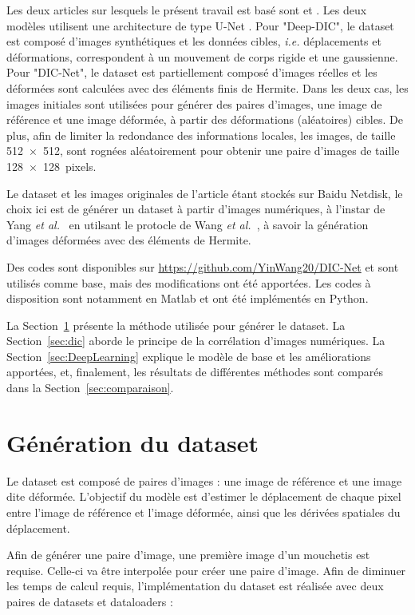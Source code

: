 \documentclass[
	a4paper, %
	10pt, %
	twoside, %
	french
]{LTJournalArticle}
\begin{document}
Les deux articles sur lesquels le présent travail est basé sont \cite{Yang:DeepDic2022} et \cite{WANG:2023107278}.
Les deux modèles utilisent une architecture de type U-Net \cite{ronneberger:2015}.
Pour "Deep-DIC", le dataset est composé d'images synthétiques et les données cibles, \textit{i.e.} déplacements et déformations, correspondent à un mouvement de corps rigide et une gaussienne.
Pour "DIC-Net", le dataset est partiellement composé d'images réelles et les déformées sont calculées avec des éléments finis de Hermite.
Dans les deux cas, les images initiales sont utilisées pour générer des paires d'images, une image de référence et une image déformée, à partir des déformations (aléatoires) cibles.
De plus, afin de limiter la redondance des informations locales, les images, de taille 512~$\times$~512, sont rognées aléatoirement pour obtenir une paire d'images de taille 128~$\times$~128~pixels.


Le dataset et les images originales de l'article \cite{WANG:2023107278} étant stockés sur Baidu Netdisk, le choix ici est de générer un dataset à partir d'images numériques, à l'instar de Yang \textit{et al.}~\cite{Yang:DeepDic2022} en utilsant le protocle de Wang \textit{et al.}~\cite{WANG:2023107278}, à savoir la génération d'images déformées avec des éléments de Hermite.

Des codes sont disponibles sur \url{https://github.com/YinWang20/DIC-Net} et sont utilisés comme base, mais des modifications ont été apportées.
Les codes à disposition sont notamment en Matlab\textregistered{} et ont été implémentés en Python.

La Section~\ref{sec:dataset} présente la méthode utilisée pour générer le dataset.
La Section~\ref{sec:dic} aborde le principe de la corrélation d'images numériques.
La Section~\ref{sec:DeepLearning} explique le modèle de base et les améliorations apportées, et, finalement, les résultats de différentes méthodes sont comparés dans la Section~\ref{sec:comparaison}.

\section{Génération du dataset}
\label{sec:dataset}
Le dataset est composé de paires d'images : une image de référence et une image dite déformée.
L'objectif du modèle est d'estimer le déplacement de chaque pixel entre l'image de référence et l'image déformée, ainsi que les dérivées spatiales du déplacement.

Afin de générer une paire d'image, une première image d'un mouchetis est requise.
Celle-ci va être interpolée pour créer une paire d'image.
Afin de diminuer les temps de calcul requis, l'implémentation du dataset est réalisée avec deux paires de datasets et dataloaders :
\end{document}
